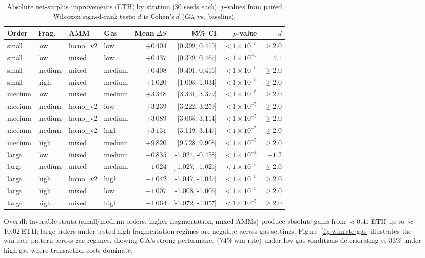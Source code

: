 \documentclass[11pt]{article}
\newcommand{\1}{\mathbf{1}}  %
\begin{document}
\begin{table}[t]
\centering
\footnotesize
\begin{tabular}{llllrrrr}
\toprule
Order & Frag. & AMM & Gas & Mean $\Delta S$ & 95\% CI & $p$-value & $d$ \\ \midrule
small & low & homo\_v2 & low & $+0.404$ & [0.399, 0.410] & $<1\times10^{-5}$ & $\geq 2.0$ \\
small & low & mixed & low & $+0.437$ & [0.379, 0.467] & $<1\times10^{-5}$ & $4.1$ \\
small & medium & mixed & medium & $+0.408$ & [0.401, 0.416] & $<1\times10^{-5}$ & $\geq 2.0$ \\
small & high & mixed & medium & $+1.020$ & [1.008, 1.034] & $<1\times10^{-5}$ & $\geq 2.0$ \\
medium & low & mixed & medium & $+3.348$ & [3.331, 3.379] & $<1\times10^{-5}$ & $\geq 2.0$ \\
medium & medium & homo\_v2 & low & $+3.239$ & [3.222, 3.259] & $<1\times10^{-5}$ & $\geq 2.0$ \\
medium & medium & homo\_v2 & medium & $+3.089$ & [3.068, 3.114] & $<1\times10^{-5}$ & $\geq 2.0$ \\
medium & medium & homo\_v2 & high & $+3.131$ & [3.119, 3.147] & $<1\times10^{-5}$ & $\geq 2.0$ \\
medium & high & mixed & medium & $+9.820$ & [9.728, 9.908] & $<1\times10^{-5}$ & $\geq 2.0$ \\
large & low & mixed & medium & $-0.835$ & [-1.024, -0.458] & $<1\times10^{-4}$ & $-1.2$ \\
large & medium & mixed & medium & $-1.024$ & [-1.027, -1.021] & $<1\times10^{-5}$ & $\geq 2.0$ \\
large & high & homo\_v2 & high & $-1.042$ & [-1.047, -1.037] & $<1\times10^{-5}$ & $\geq 2.0$ \\
large & high & mixed & low & $-1.007$ & [-1.008, -1.006] & $<1\times10^{-5}$ & $\geq 2.0$ \\
large & high & mixed & high & $-1.064$ & [-1.072, -1.057] & $<1\times10^{-5}$ & $\geq 2.0$ \\
\bottomrule
\end{tabular}
\caption{Absolute net-surplus improvements (ETH) by stratum (30 seeds each). $p$-values from paired Wilcoxon signed-rank tests; $d$ is Cohen's $d$ (GA vs. baseline).}
\label{tab:statistical-results}
\end{table}

Overall: favorable strata (small/medium orders, higher fragmentation, mixed AMMs) produce absolute gains from $\approx$0.41 ETH up to $\approx$10.02 ETH; large orders under tested high-fragmentation regimes are negative across gas settings. Figure~\ref{fig:winrate-gas} illustrates the win rate pattern across gas regimes, showing GA's strong performance (74\% win rate) under low gas conditions deteriorating to 33\% under high gas where transaction costs dominate.
\end{document}
